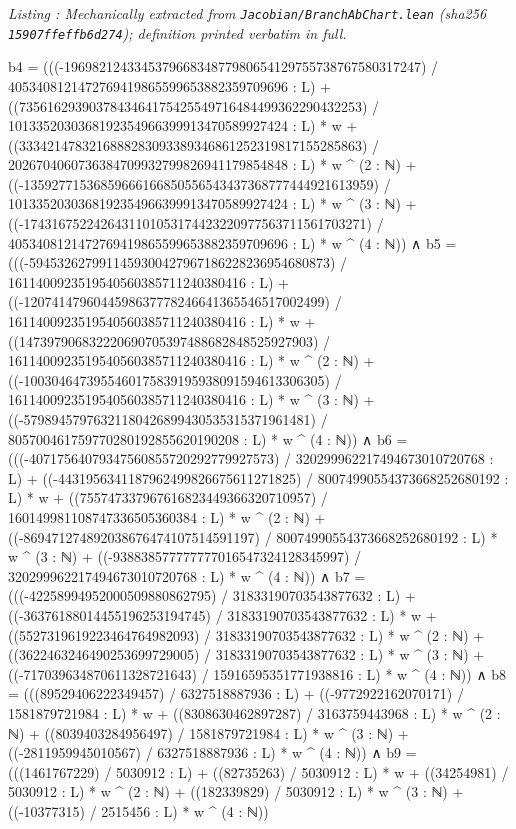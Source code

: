 \documentclass[a4paper,11pt]{article}
\newcounter{leanlisting}
\newenvironment{leanlisting}[2]{%
  \refstepcounter{leanlisting}\label{#2}%
  \begin{center}\textit{\small Listing \theleanlisting: #1}\end{center}%
  \Verbatim[breaklines=true,breakanywhere=true,fontsize=\footnotesize,frame=single,framesep=4pt,rulecolor=\color{gray!50},fillcolor=\color{gray!5}]%
}{%
  \endVerbatim%
}
\theoremstyle{plain}
\theoremstyle{definition}
\theoremstyle{remark}
\begin{document}
\begin{leanlisting}{Mechanically extracted from \texttt{Jacobian/BranchAbChart.lean} (sha256 \texttt{15907ffeffb6d274}); definition printed verbatim in full.}{lst:def-chartclass}
      b4 = (((-196982124334537966834877980654129755738767580317247) / 4053408121472769419865599653882359709696 : L) + ((7356162939037843464175425549716484499362290432253) / 1013352030368192354966399913470589927424 : L) * w + ((3334214783216888283093389346861252319817155285863) / 2026704060736384709932799826941179854848 : L) * w ^ (2 : ℕ) + ((-13592771536859666166850556543437368777444921613959) / 1013352030368192354966399913470589927424 : L) * w ^ (3 : ℕ) + ((-1743167522426431101053174423220977563711561703271) / 4053408121472769419865599653882359709696 : L) * w ^ (4 : ℕ)) ∧
      b5 = (((-5945326279911459300427967186228236954680873) / 1611400923519540560385711240380416 : L) + ((-1207414796044598637778246641365546517002499) / 1611400923519540560385711240380416 : L) * w + ((147397906832220690705397488682848525927903) / 1611400923519540560385711240380416 : L) * w ^ (2 : ℕ) + ((-1003046473955460175839195938091594613306305) / 1611400923519540560385711240380416 : L) * w ^ (3 : ℕ) + ((-57989457976321180426899430535315371961481) / 805700461759770280192855620190208 : L) * w ^ (4 : ℕ)) ∧
      b6 = (((-40717564079347560855720292779927573) / 320299962217494673010720768 : L) + ((-4431956341187962499826675611271825) / 80074990554373668252680192 : L) * w + ((755747337967616823449366320710957) / 160149981108747336505360384 : L) * w ^ (2 : ℕ) + ((-869471274892038676474107514591197) / 80074990554373668252680192 : L) * w ^ (3 : ℕ) + ((-938838577777777016547324128345997) / 320299962217494673010720768 : L) * w ^ (4 : ℕ)) ∧
      b7 = (((-42258994952000509880862795) / 31833190703543877632 : L) + ((-36376188014455196253194745) / 31833190703543877632 : L) * w + ((5527319619223464764982093) / 31833190703543877632 : L) * w ^ (2 : ℕ) + ((3622463246490253699729005) / 31833190703543877632 : L) * w ^ (3 : ℕ) + ((-717039634870611328721643) / 15916595351771938816 : L) * w ^ (4 : ℕ)) ∧
      b8 = (((89529406222349457) / 6327518887936 : L) + ((-9772922162070171) / 1581879721984 : L) * w + ((8308630462897287) / 3163759443968 : L) * w ^ (2 : ℕ) + ((8039403284956497) / 1581879721984 : L) * w ^ (3 : ℕ) + ((-2811959945010567) / 6327518887936 : L) * w ^ (4 : ℕ)) ∧
      b9 = (((1461767229) / 5030912 : L) + ((82735263) / 5030912 : L) * w + ((34254981) / 5030912 : L) * w ^ (2 : ℕ) + ((182339829) / 5030912 : L) * w ^ (3 : ℕ) + ((-10377315) / 2515456 : L) * w ^ (4 : ℕ))
\end{leanlisting}
\end{document}
